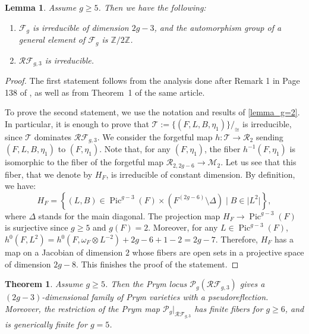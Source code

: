 \documentclass[preprint,12pt]{amsart}
\def\bZ{\ensuremath{\mathbb{Z}}}
\def\cF{\ensuremath{\mathcal{F}}}
\def\cM{\ensuremath{\mathcal{M}}}
\def\cP{\ensuremath{\mathcal{P}}}
\def\cR{\ensuremath{\mathcal{R}}}
\def\cT{\ensuremath{\mathcal{T}}}
\DeclareMathOperator{\Pic}{Pic}
\newcommand{\set}[1]{\left\{#1\right\}}
\theoremstyle{plain}
\newtheorem{theorem}{Theorem}[section]
\newtheorem{lemma}[lemma]{Lemma}
\theoremstyle{definition}
\begin{document}
\begin{lemma}\label{lem:Fg} Assume $g\geq 5$.
Then we have the following:
\begin{enumerate}
\item $\cF_g$ is irreducible of dimension $2g-3$, and the automorphism group of a general element of $\cF_g$ is $\bZ/2\bZ$.
\item $\cR\cF_{g,3}$ is irreducible.
\end{enumerate}
\end{lemma}
\begin{proof}
The first statement follows from the analysis done after Remark 1 in Page 138 of \cite{Cornalba}, as well as from Theorem~1 of the same article.

To prove the second statement, we use the notation and results of \autoref{lemma_g=2}.
In particular, it is enough to prove that $\cT:=\{(F,L,B,\eta_1)\}/_{\cong}$ is irreducible, since $\cT$ dominates $\cR\cF_{g,3}$.
We consider the forgetful map $h:\cT \rightarrow \cR_2$ sending $(F,L,B,\eta_1)$ to $(F,\eta_1)$.
Note that, for any $(F,\eta_1)$, the fiber $h^{-1}(F,\eta_1)$ is isomorphic to the fiber of the forgetful map $\cR_{2,2g-6}\rightarrow \cM_2$.
Let us see that this fiber, that we denote by $H_F$, is irreducible of constant dimension.
By definition, we have:
\[
H_F=\set{(L,B)\in \Pic^{g-3}(F)\times (F^{(2g-6)}\setminus \Delta) \mid B\in \vert L^2 \vert },
\]
where $\Delta $ stands for the main diagonal.
The projection map $H_F\rightarrow \Pic^{g-3}(F)$ is surjective since $g\ge 5$ and $g(F)=2$.
Moreover, for any $L\in \Pic^{g-3}(F)$, $h^0(F,L^2)=h^0(F,\omega_F\otimes L^{-2})+2g-6+1-2=2g-7$.
Therefore, $H_F$ has a map on a Jacobian of dimension $2$ whose fibers are open sets in a projective space of dimension $2g-8$.
This finishes the proof of the statement.
\end{proof}

\begin{theorem}\label{RFg3}
Assume $g\geq 5$.
Then the Prym locus $\cP_g(\cR\cF_{g,3})$ gives a $(2g-3)$-dimensional family of Prym varieties with a pseudoreflection.
Moreover, the restriction of the Prym map $\cP_g|_{\cR\cF_{g,3}}$ has finite fibers for $g\geq6$, and is generically finite for $g=5$.
\end{theorem}
\end{document}
